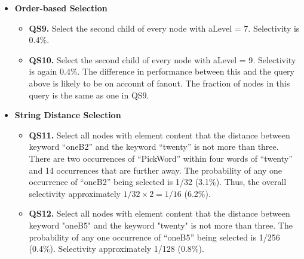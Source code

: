\begin {itemize}
\item {\bf Order-based Selection}
\begin{itemize}
\item
{\bf QS9.} Select the second child of every node with {\sf aLevel = 7}.
Selectivity is 0.4\%.  
\item
{\bf QS10.} Select the second child of every node with {\sf aLevel = 9}.
Selectivity is again 0.4\%.  The difference in performance between
this and the query above is likely to be on account of fanout. The fraction
of nodes in this query is the same as one in QS9.
\end{itemize}
\item {\bf String Distance Selection}
\begin{itemize}
\item
{\bf QS11.} Select all nodes with element content that the distance between keyword {\sf
``oneB2''} and the keyword {\sf
``twenty''} is not more than three. 
There are two occurrences of ``PickWord'' within four words of {\sf ``twenty''} and
14 occurrences that are further away.  The probability of any one
occurrence of ``oneB2'' being selected is 1/32 (3.1\%).
Thus, the overall selectivity approximately $1/32 \times 2 = 1/16$ (6.2\%).
\item
{\bf QS12.} Select all nodes with element content that the distance between keyword {\sf "oneB5"} and the keyword {\sf "twenty"} is not more than three.
The probability of any one occurrence of ``oneB5'' being selected 
 is 1/256 (0.4\%).
Selectivity approximately 1/128 (0.8\%).
\end{itemize}
\end{itemize}


